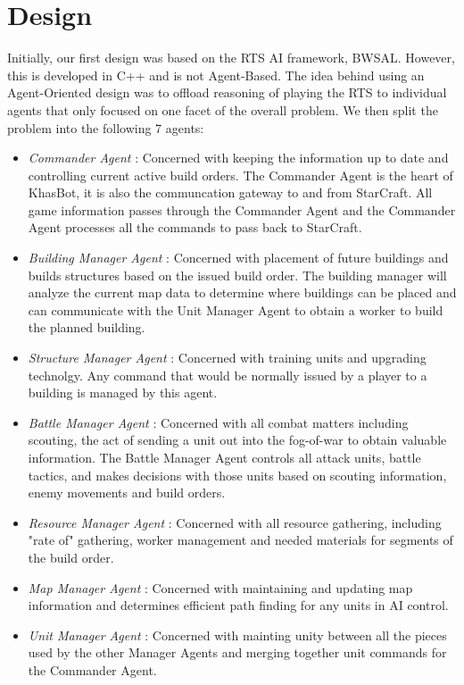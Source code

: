 \documentclass[letterpaper]{article}
\begin{document}
\section{Design}
Initially, our first design was based on the RTS AI framework, BWSAL.  However, this is developed in C++ and is not Agent-Based. The idea behind using an Agent-Oriented design was to offload reasoning of playing the RTS to individual agents that only focused on one facet of the overall problem.  We then split the problem into the following 7 agents:
\begin{itemize}
\item \emph{Commander Agent} : Concerned with keeping the information up to date and controlling current active build orders.  The Commander Agent is the heart of KhasBot, it is also the communcation gateway to and from StarCraft.  All game information passes through the Commander Agent and the Commander Agent processes all the commands to pass back to StarCraft.
\item \emph{Building Manager Agent} :  Concerned with placement of future buildings and builds structures based on the issued build order.  The building manager will analyze the current map data to determine where buildings can be placed and can communicate with the Unit Manager Agent to obtain a worker to build the planned building.
\item \emph{Structure Manager Agent} : Concerned with training units and upgrading technolgy.  Any command that would be normally issued by a player to a building is managed by this agent.
\item \emph{Battle Manager Agent} : Concerned with all combat matters including scouting, the act of sending a unit out into the fog-of-war to obtain valuable information.  The Battle Manager Agent controls all attack units, battle tactics, and makes decisions with those units based on scouting information, enemy movements and build orders.
\item \emph{Resource Manager Agent} : Concerned with all resource gathering, including "rate of" gathering, worker management and needed materials for segments of the build order.
\item \emph{Map Manager Agent} : Concerned with maintaining and updating map information and determines efficient path finding for any units in AI control.
\item \emph{Unit Manager Agent} : Concerned with mainting unity between all the pieces used by the other Manager Agents and merging together unit commands for the Commander Agent.
\end{itemize}
\end{document}
